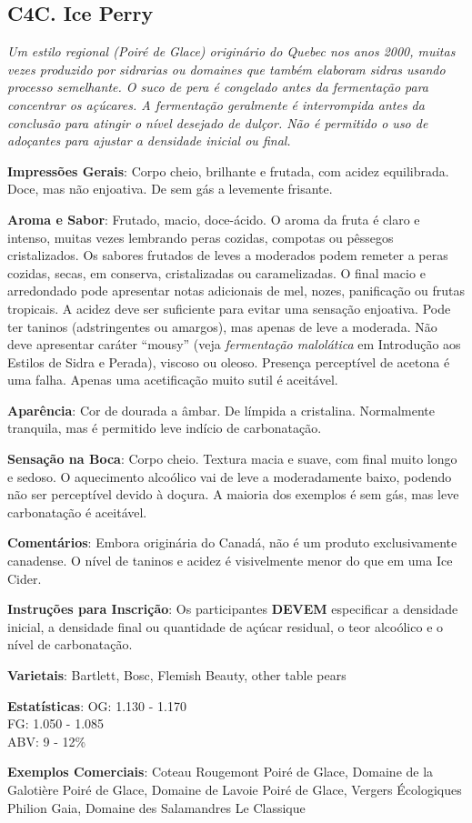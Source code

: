 \subsection*{C4C. Ice Perry}

\textit{Um estilo regional (\textit{Poiré de Glace}) originário do Quebec nos anos 2000, muitas vezes produzido por sidrarias ou domaines que também elaboram sidras usando processo semelhante. O suco de pera é congelado antes da fermentação para concentrar os açúcares. A fermentação geralmente é interrompida antes da conclusão para atingir o nível desejado de dulçor. Não é permitido o uso de adoçantes para ajustar a densidade inicial ou final.}

\textbf{Impressões Gerais}: Corpo cheio, brilhante e frutada, com acidez equilibrada. Doce, mas não enjoativa. De sem gás a levemente frisante.

\textbf{Aroma e Sabor}: Frutado, macio, doce-ácido. O aroma da fruta é claro e intenso, muitas vezes lembrando peras cozidas, compotas ou pêssegos cristalizados. Os sabores frutados de leves a moderados podem remeter a peras cozidas, secas, em conserva, cristalizadas ou caramelizadas. O final macio e arredondado pode apresentar notas adicionais de mel, nozes, panificação ou frutas tropicais. A acidez deve ser suficiente para evitar uma sensação enjoativa. Pode ter taninos (adstringentes ou amargos), mas apenas de leve a moderada. Não deve apresentar caráter “mousy” (veja \textit{fermentação malolática} em Introdução aos Estilos de Sidra e Perada), viscoso ou oleoso. Presença perceptível de acetona é uma falha. Apenas uma acetificação muito sutil é aceitável.

\textbf{Aparência}: Cor de dourada a âmbar. De límpida a cristalina. Normalmente tranquila, mas é permitido leve indício de carbonatação.

\textbf{Sensação na Boca}: Corpo cheio. Textura macia e suave, com final muito longo e sedoso. O aquecimento alcoólico vai de leve a moderadamente baixo, podendo não ser perceptível devido à doçura. A maioria dos exemplos é sem gás, mas leve carbonatação é aceitável.

\textbf{Comentários}: Embora originária do Canadá, não é um produto exclusivamente canadense. O nível de taninos e acidez é visivelmente menor do que em uma Ice Cider.

\textbf{Instruções para Inscrição}: Os participantes \textbf{DEVEM} especificar a densidade inicial, a densidade final ou quantidade de açúcar residual, o teor alcoólico e o nível de carbonatação.

\textbf{Varietais}: Bartlett, Bosc, Flemish Beauty, other table pears

\textbf{Estatísticas}: OG: 1.130 - 1.170 \\
\phantom{ } \hspace{16.5mm} FG: 1.050 - 1.085 \\
\phantom{ } \hspace{16.5mm} ABV: 9 - 12\%

\textbf{Exemplos Comerciais}: Coteau Rougemont Poiré de Glace, Domaine de la Galotière Poiré de Glace, Domaine de Lavoie Poiré de Glace, Vergers Écologiques Philion Gaia, Domaine des Salamandres Le Classique